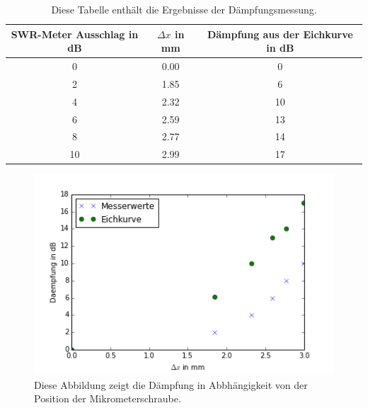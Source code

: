 \documentclass[a4paper]{article}
\begin{document}
\begin{table}[h]
\centering
\begin{tabular}{ccc}
\toprule
SWR-Meter Ausschlag in \si{\dB}  & $\Delta x$ in \si{\milli\meter}  & Dämpfung aus der Eichkurve in \si{\dB} \\
\midrule
0 & 0.00 & 0 \\
2 & 1.85 & 6 \\
4 & 2.32 & 10 \\
6 & 2.59 & 13 \\
8 & 2.77 & 14 \\
10 & 2.99 & 17 \\
\bottomrule
\end{tabular}
\label{daempftab}
\caption{Diese Tabelle enthält die Ergebnisse der Dämpfungsmessung.}
\end{table}

\begin{figure}[h]
\centering
\includegraphics[scale=0.7]{daempf_plot.png}
\caption{Diese Abbildung zeigt die Dämpfung in Abbhängigkeit von der Position der Mikrometerschraube.}
\label{daempf_plot}
\end{figure}
\end{document}
